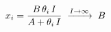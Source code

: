\documentclass[preview]{standalone}
\begin{document}
\begin{align*}
\special{dvisvgm:raw <g id='unique000'>}x_i = \frac{B\,\theta_i\, I}{A + \theta_i\, I}\;\xrightarrow{I\to\infty}\; B\special{dvisvgm:raw </g>}
\end{align*}
\end{document}

